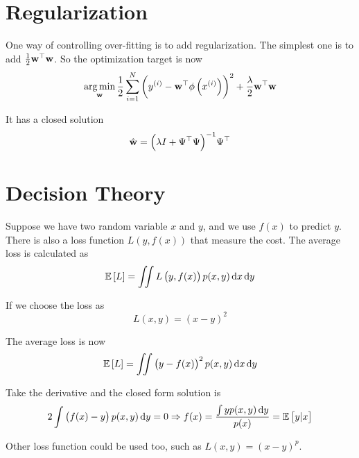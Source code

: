 \section{Regularization}

One way of controlling over-fitting is to add regularization. The simplest one is to add $\frac{1}{2} {\mathbf{w}}^\top\mathbf{w}$. So the optimization target is now
\begin{equation}
    \mathop{\arg\min}\limits_{\mathbf{w}} \frac{1}{2} \sum_{i=1}^N \left( {y}^{(i)} - {\mathbf{w}}^\top \phi\left({x}^{(i)}\right) \right)^2 + \frac{\lambda}{2} {\mathbf{w}}^\top\mathbf{w}
\end{equation}

It has a closed solution
\begin{equation}
    \hat{\mathbf{w}} = {\left(\lambda I + {\Psi}^\top \Psi\right)}^{-1} {\Psi}^\top 
\end{equation}



\section{Decision Theory}

Suppose we have two random variable $x$ and $y$, and we use $f(x)$ to predict $y$. There is also a loss function $L(y, f(x))$ that measure the cost. The average loss is calculated as
\begin{equation}
    \expectation{L} = \iint L\left(y, f(x)\right) p(x,y) \dif x \dif y
\end{equation}

If we choose the loss as
\begin{equation}\label{square_loss}
    L(x, y) = (x-y)^2
\end{equation}

The average loss is now
\begin{equation}
    \expectation{L} = \iint \left(y - f(x)\right)^2 p(x,y) \dif x \dif y
\end{equation}

Take the derivative and the closed form solution is
\begin{equation}
    2 \int \left( f(x) -y \right) p(x,y) \dif y = 0 \Rightarrow f(x) = \frac{\int y p(x,y) \dif y}{p(x)} = \expectation{y|x}
\end{equation}

Other loss function could be used too, such as  $L(x,y) = (x - y)^p$.



